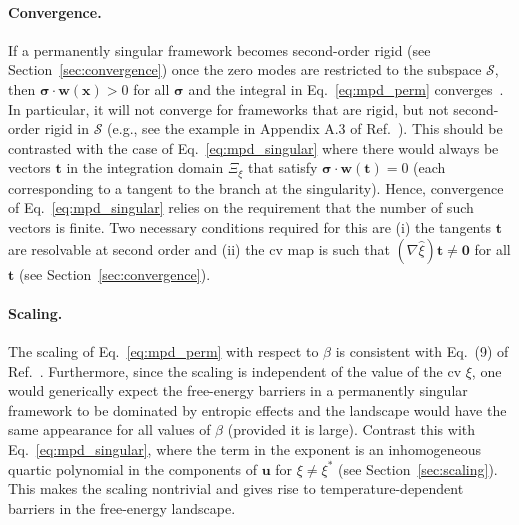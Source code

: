 \paragraph{Convergence.}
If a permanently singular framework becomes second-order rigid (see Section~\ref{sec:convergence}) once the zero modes are restricted to the subspace $\mathscr{S}$, then $\bm{\sigma}\cdot\bm{w}(\bm{x}) > 0$ for all $\bm{\sigma}$ and the integral in Eq.~\eqref{eq:mpd_perm} converges~\cite{kallus2017}.
In particular, it will not converge for frameworks that are rigid, but not second-order rigid in $\mathscr{S}$ (e.g., see the example in Appendix A.3 of Ref.~\cite{connelly1996}).
This should be contrasted with the case of Eq.~\eqref{eq:mpd_singular} where there would always be vectors $\bm{t}$ in the integration domain $\Xi_{\xi}$ that satisfy $\bm{\sigma}\cdot\bm{w}(\bm{t}) = 0$ (each corresponding to a tangent to the branch at the singularity).
Hence, convergence of Eq.~\eqref{eq:mpd_singular} relies on the requirement that the number of such vectors is finite. Two necessary conditions required for this are (i) the tangents $\bm{t}$ are resolvable at second order and (ii) the \ac{cv} map is such that $(\nabla\hat{\xi})\bm{t} \neq \bm{0}$ for all $\bm{t}$ (see Section~\ref{sec:convergence}).

\paragraph{Scaling.}
The scaling of Eq.~\eqref{eq:mpd_perm} with respect to $\beta$ is consistent with Eq.~(9) of Ref.~\cite{kallus2017}.
Furthermore, since the scaling is independent of the value of the \ac{cv} $\xi$, one would generically expect the free-energy barriers in a permanently singular framework to be dominated by entropic effects and the landscape would have the same appearance for all values of $\beta$ (provided it is large).
Contrast this with Eq.~\eqref{eq:mpd_singular}, where the term in the exponent is an inhomogeneous quartic polynomial in the components of $\bm{u}$ for $\xi \neq \xi^{*}$ (see Section~\ref{sec:scaling}).
This makes the scaling nontrivial and gives rise to temperature-dependent barriers in the free-energy landscape.

